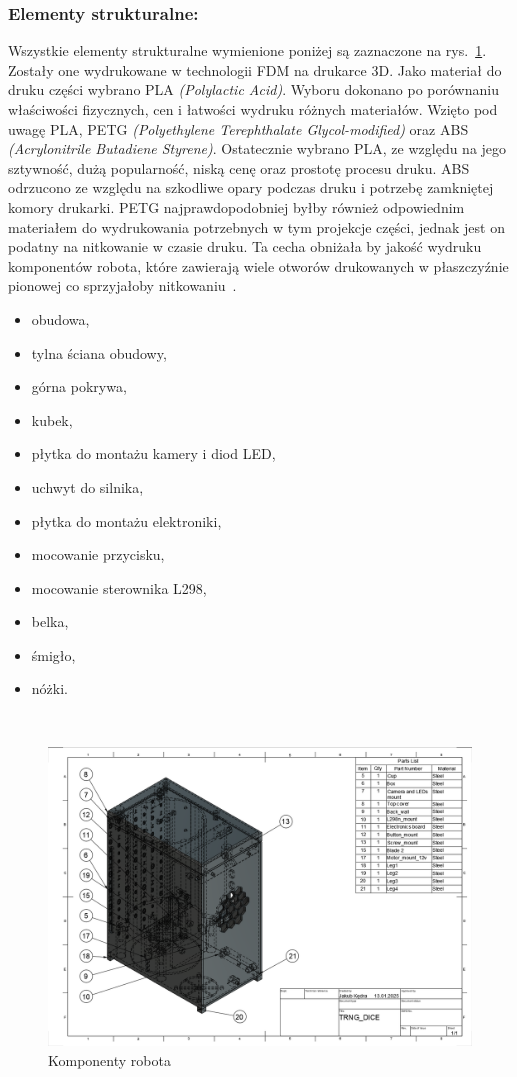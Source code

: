 \subsubsection{Elementy strukturalne:}
Wszystkie elementy strukturalne wymienione poniżej są zaznaczone na rys.~\ref{fig:komponenty}. Zostały one wydrukowane w technologii FDM na drukarce 3D. Jako materiał do druku części wybrano
PLA \textit{(Polylactic Acid)}. Wyboru dokonano po porównaniu właściwości fizycznych, cen i łatwości wydruku różnych materiałów. Wzięto pod uwagę
PLA, PETG \textit{(Polyethylene Terephthalate Glycol-modified)} oraz ABS \textit{(Acrylonitrile Butadiene Styrene)}. Ostatecznie wybrano PLA, ze względu na jego sztywność, dużą popularność,
niską cenę oraz prostotę procesu druku. ABS odrzucono ze względu na szkodliwe opary podczas druku i potrzebę zamkniętej komory drukarki. PETG najprawdopodobniej
byłby również odpowiednim materiałem do wydrukowania potrzebnych w tym projekcje części, jednak jest on podatny na nitkowanie w czasie druku. Ta cecha
obniżała by jakość wydruku komponentów robota, które zawierają wiele otworów drukowanych w płaszczyźnie pionowej co sprzyjałoby nitkowaniu~\cite{PLA,PETG,ABS,PLA2}.
    \begin{itemize}
        \item obudowa,
        \item tylna ściana obudowy,
        \item górna pokrywa,
        \item kubek,
        \item płytka do montażu kamery i diod LED,
        \item uchwyt do silnika,
        \item płytka do montażu elektroniki,
        \item mocowanie przycisku,
        \item mocowanie sterownika L298,
        \item belka,
        \item śmigło,
        \item nóżki.
    \end{itemize}\
    \begin{figure}[H]
        \centering
        \includegraphics[width=0.95\linewidth]{chapters/03-praca-wlasna/figures/komponenty}
        \caption{\label{fig:komponenty}Komponenty robota}
    \end{figure}

